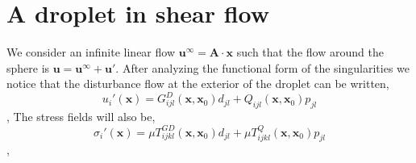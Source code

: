 \section{A droplet in shear flow}

We consider an infinite linear flow $\textbf{u}^\infty = \textbf{A}\cdot \textbf{x}$ such that the flow around the sphere is $\textbf{u}= \textbf{u}^\infty + \textbf{u}'$.
After analyzing the functional form of the singularities we notice that the disturbance flow at the exterior of the droplet can be written, 
\begin{equation*}
    u_i'(\textbf{x}) 
    = G^D_{ijl}(\textbf{x},\textbf{x}_0)d_{jl}
    + Q_{ijl}(\textbf{x},\textbf{x}_0)p_{jl}
\end{equation*},
The stress fields will also be, 
\begin{equation*}
    \sigma_i'(\textbf{x}) 
    = \mu T^{GD}_{ijkl}(\textbf{x},\textbf{x}_0) d_{jl}
    + \mu T^Q_{ijkl}(\textbf{x},\textbf{x}_0) p_{jl}
\end{equation*},

